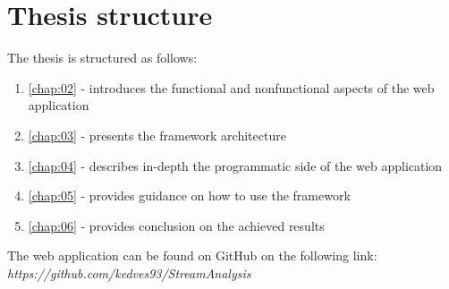 \section{Thesis structure}
\label{chap:01:03}

The thesis is structured as follows:

\begin{enumerate}
	\item \autoref{chap:02} - introduces the functional and nonfunctional aspects of the web application
	\item \autoref{chap:03} - presents the framework architecture
	\item \autoref{chap:04} - describes in-depth the programmatic side of the web application 
	\item \autoref{chap:05} - provides guidance on how to use the framework 
	\item \autoref{chap:06} - provides conclusion on the achieved results
\end{enumerate}

The web application can be found on GitHub on the following link:\\

\textit{https://github.com/kedves93/StreamAnalysis}
